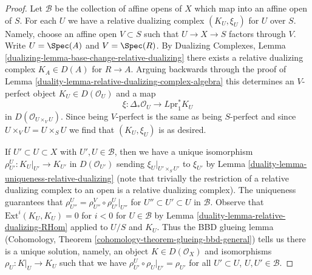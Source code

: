 \begin{proof}

Let $\mathcal{B}$ be the collection of affine opens of
$X$ which map into an affine open of $S$. For each $U$
we have a relative dualizing complex $(K_U, \xi_U)$ for
$U$ over $S$. Namely, choose an affine open
$V \subset S$ such that $U \to X \to S$ factors through $V$.
Write $U = \Spec(A)$ and $V = \Spec(R)$. By
Dualizing Complexes, Lemma \ref{dualizing-lemma-base-change-relative-dualizing}
there exists a relative dualizing complex $K_A \in D(A)$
for $R \to A$. Arguing backwards through the proof of
Lemma \ref{duality-lemma-relative-dualizing-complex-algebra}
this determines an $V$-perfect object $K_U \in D(\mathcal{O}_U)$
and a map
$$
\xi : \Delta_*\mathcal{O}_U \to L\text{pr}_1^*K_U
$$
in $D(\mathcal{O}_{U \times_V U})$. Since being $V$-perfect is the
same as being $S$-perfect and since $U \times_V U = U \times_S U$
we find that $(K_U, \xi_U)$ is as desired.

\medskip\noindent
If $U' \subset U \subset X$ with $U', U \in \mathcal{B}$, then
we have a unique isomorphism $\rho_{U'}^U : K_U|_{U'} \to K_{U'}$
in $D(\mathcal{O}_{U'})$ sending $\xi_U|_{U' \times_S U'}$
to $\xi_{U'}$ by Lemma \ref{duality-lemma-uniqueness-relative-dualizing}
(note that trivially the restriction of a relative dualizing
complex to an open is a relative dualizing complex).
The uniqueness guarantees that
$\rho^U_{U''} = \rho^V_{U''} \circ \rho ^U_{U'}|_{U''}$
for $U'' \subset U' \subset U$ in $\mathcal{B}$.
Observe that $\text{Ext}^i(K_U, K_U) = 0$ for $i < 0$
for $U \in \mathcal{B}$ by Lemma \ref{duality-lemma-relative-dualizing-RHom}
applied to $U/S$ and $K_U$.
Thus the BBD glueing lemma
(Cohomology, Theorem \ref{cohomology-theorem-glueing-bbd-general})
tells us there is a unique solution, namely, an object
$K \in D(\mathcal{O}_X)$ and isomorphisms $\rho_U : K|_U \to K_U$
such that we have
$\rho^U_{U'} \circ \rho_U|_{U'} = \rho_{U'}$ for all $U' \subset U$,
$U, U' \in \mathcal{B}$.


\end{proof}
